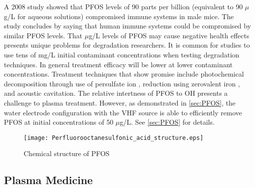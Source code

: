 A 2008 study showed that PFOS levels of 90 parts per billion (equivalent to 90 $\mu$g/L for aqueous solutions) compromised immune systems in male mice. \cite{betts2008chemical} The study concludes by saying that human immune systems could be compromised by similar PFOS levels. That $\mu$g/L levels of PFOS may cause negative health effects presents unique problems for degradation researchers. It is common for studies to use tens of mg/L initial contaminant concentrations when testing degradation techniques. In general treatment efficacy will be lower at lower contaminant concentrations. Treatment techniques that show promise include photochemical decomposition through use of persulfate ion \cite{hori2005efficient}, reduction using zerovalent iron \cite{hori2006efficient}, and acoustic cavitation. \cite{moriwaki2005sonochemical,cheng2008sonochemical} The relative intertness of PFOS to OH presents a challenge to plasma treatment. However, as demonstrated in \cref{sec:PFOS}, the water electrode configuration with the VHF source is able to efficiently remove PFOS at initial concentrations of 50 $\mu$g/L. See \cref{sec:PFOS} for details.

\begin{figure}[htbp]
  \centering
  \texttt{[image: Perfluorooctanesulfonic\_acid\_structure.eps]}
  \caption{Chemical structure of PFOS}
  \label{fig:PFOS_struct}
\end{figure}

\subsection{Plasma Medicine}

